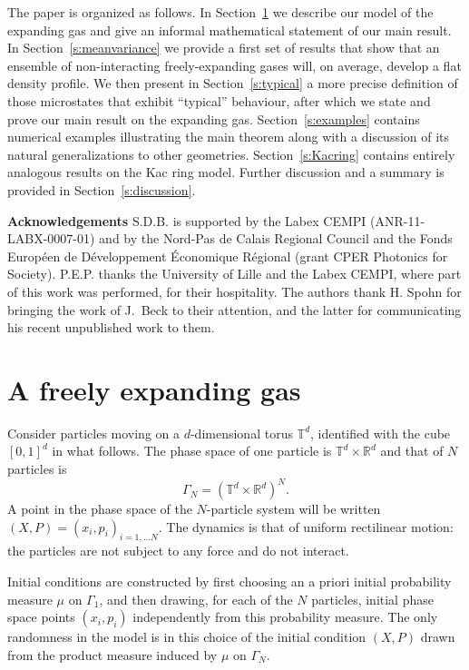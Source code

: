 \documentclass{article}
\newcommand {\R}{\mathbb{R}}
\newcommand {\T}{\mathbb{T}}
\numberwithin{equation}{section}
\begin{document}
The paper is organized as follows. In Section~\ref{s:freeexpansion} we
describe our model of the expanding gas and give an informal mathematical
statement of our main result.
In Section~\ref{s:meanvariance} we provide a first set of
results that show that an ensemble of non-interacting freely-expanding gases will,
on average, develop a flat density profile.
We then present in Section~\ref{s:typical} a more precise definition of those microstates
that exhibit ``typical'' behaviour, after which we state and prove our main result on the expanding
gas. Section~\ref{s:examples} contains numerical examples illustrating the main theorem along with a discussion of its natural generalizations to other geometries.
Section~\ref{s:Kacring} contains entirely analogous results on the Kac ring model.
Further discussion and a summary is provided in Section~\ref{s:discussion}.

\noindent\textbf{Acknowledgements} S.D.B. is supported by the Labex CEMPI (ANR-11-LABX-0007-01) and by the Nord-Pas de Calais Regional Council and the Fonds Europ\'een de D\'eveloppement \'Economique R\'egional (grant CPER Photonics for Society). P.E.P. thanks the University of Lille and the Labex CEMPI, where part of this work was performed, for their hospitality.  The authors thank H. Spohn for bringing the work of J.~Beck to their attention, and the latter for communicating his recent unpublished work to them.

\section{A freely expanding gas}\label{s:freeexpansion}
Consider particles moving on a $d$-dimensional torus $\T^d$, identified with the
cube $[0,1]^d$ in what follows. The phase space of one particle
is $\T^d\times \R^d$ and that of $N$ particles is
$$
\Gamma_N=\left(\T^d\times\R^d\right)^N.
$$
A point in the phase space of the $N$-particle system will be written
$(X,P)=(x_{i},p_{i})_{i=1,\dots N}$. The dynamics is that of uniform
rectilinear motion: the particles are not subject to any force and do not
interact.

Initial conditions are constructed by
first choosing an a priori initial probability measure $\mu$ on $\Gamma_{1}$, and
then drawing, for each of the $N$ particles, initial phase space points
$(x_{i},p_{i})$ independently from this probability measure. The only randomness in
the model is in this choice of the initial condition $\left(  X,P\right)  $
drawn from the product measure induced by $\mu$ on $\Gamma_{N}$.
\end{document}
